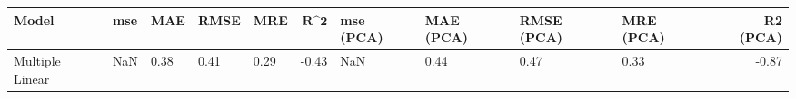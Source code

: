 \begin{table}
\centering
\label{table:iri_reg_pred}
\begin{tabular}{lllllrllllr}
\toprule
 \textbf{Model} & \textbf{mse} & \textbf{MAE} & \textbf{RMSE} & \textbf{MRE} & $\textbf{R^2}$ & \textbf{mse (PCA)} & \textbf{MAE (PCA)} & \textbf{RMSE (PCA)} & \textbf{MRE (PCA)} & \textbf{R2 (PCA)} \\
\midrule
Multiple Linear &          NaN &         0.38 &          0.41 &         0.29 &          -0.43 &                NaN &               0.44 &                0.47 &               0.33 &             -0.87 \\
\bottomrule
\end{tabular}
\end{table}
